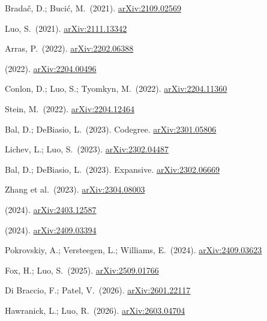 \documentclass[12pt,a4paper,twoside,openright]{book}
\theoremstyle{definition}
\newcommand{\arxiv}[1]{\href{https://arxiv.org/abs/#1}{\textcolor{linkcolor}{arXiv:#1}}}
\begin{document}
\begin{enumerate}[label={[\arabic*]}, leftmargin=2cm]
\item Bradač, D.; Bucić, M.\ (2021). \arxiv{2109.02569}
\item Luo, S.\ (2021). \arxiv{2111.13342}
\item Arras, P.\ (2022). \arxiv{2202.06388}
\item (2022). \arxiv{2204.00496}
\item Conlon, D.; Luo, S.; Tyomkyn, M.\ (2022). \arxiv{2204.11360}
\item Stein, M.\ (2022). \arxiv{2204.12464}
\item Bal, D.; DeBiasio, L.\ (2023). Codegree. \arxiv{2301.05806}
\item Lichev, L.; Luo, S.\ (2023). \arxiv{2302.04487}
\item Bal, D.; DeBiasio, L.\ (2023). Expansive. \arxiv{2302.06669}
\item Zhang et al.\ (2023). \arxiv{2304.08003}
\item (2024). \arxiv{2403.12587}
\item (2024). \arxiv{2409.03394}
\item Pokrovskiy, A.; Versteegen, L.; Williams, E.\ (2024). \arxiv{2409.03623}
\item Fox, H.; Luo, S.\ (2025). \arxiv{2509.01766}
\item Di Braccio, F.; Patel, V.\ (2026). \arxiv{2601.22117}
\item Hawranick, L.; Luo, R.\ (2026). \arxiv{2603.04704}
\end{enumerate}
\end{document}
